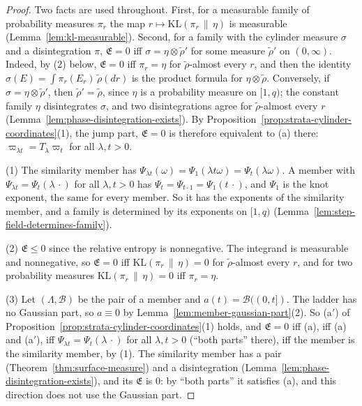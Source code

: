 \begin{proof}
Two facts are used throughout. First, for a measurable family of probability measures $\pi_r$ the
map $r \mapsto \mathrm{KL}(\pi_r \,\|\, \eta)$ is measurable (Lemma~\ref{lem:kl-measurable}).
Second, for a family with the
cylinder measure $\sigma$ and a disintegration $\pi$, $\mathfrak{E} = 0$ iff
$\sigma = \eta \otimes \tilde\rho'$ for some measure $\tilde\rho'$ on $(0,\infty)$. Indeed, by (2)
below, $\mathfrak{E} = 0$ iff $\pi_r = \eta$ for $\tilde\rho$-almost every $r$, and then the identity
$\sigma(E) = \int\pi_r(E_r)\,\tilde\rho(dr)$ is the product formula for $\eta \otimes \tilde\rho$.
Conversely, if $\sigma = \eta \otimes \tilde\rho'$, then $\tilde\rho' = \tilde\rho$, since $\eta$ is a
probability measure on $[1,q)$; the constant family $\eta$ disintegrates $\sigma$, and two
disintegrations agree for $\tilde\rho$-almost every $r$
(Lemma~\ref{lem:phase-disintegration-exists}). By
Proposition~\ref{prop:strata-cylinder-coordinates}(1), the jump part, $\mathfrak{E} = 0$ is therefore
equivalent to (a) there: $\varpi_{\lambda t} = T_\lambda\varpi_t$ for all $\lambda, t > 0$.

(1) The similarity member has $\Psi_{\lambda t}(\omega) = \Psi_1(\lambda t\omega) = \Psi_t(\lambda\omega)$.
A member with $\Psi_{\lambda t} = \Psi_t(\lambda\,\cdot)$ for all $\lambda, t > 0$ has
$\Psi_t = \Psi_{t\cdot1} = \Psi_1(t\,\cdot)$, and $\Psi_1$ is the knot exponent, the same for every
member. So it has the exponents of the similarity member, and a family is determined by its
exponents on $[1,q)$ (Lemma~\ref{lem:step-field-determines-family}).

(2) $\mathfrak{E} \le 0$ since the relative entropy is nonnegative. The integrand is measurable and
nonnegative, so $\mathfrak{E} = 0$ iff $\mathrm{KL}(\pi_r \,\|\, \eta) = 0$ for $\tilde\rho$-almost
every $r$, and for two probability measures $\mathrm{KL}(\pi_r \,\|\, \eta) = 0$ iff $\pi_r = \eta$.

(3) Let $(\Lambda, \mathcal{B})$ be the pair of a member and $a(t) = \mathcal{B}((0,t])$. The
ladder has no Gaussian part, so $a \equiv 0$ by Lemma~\ref{lem:member-gaussian-part}(2). So (a$'$) of
Proposition~\ref{prop:strata-cylinder-coordinates}(1) holds, and $\mathfrak{E} = 0$ iff (a), iff (a)
and (a$'$), iff $\Psi_{\lambda t} = \Psi_t(\lambda\,\cdot)$ for all $\lambda, t > 0$ (``both parts''
there), iff the member is the similarity member, by (1). The similarity member has a pair
(Theorem~\ref{thm:surface-measure}) and a disintegration
(Lemma~\ref{lem:phase-disintegration-exists}), and its $\mathfrak{E}$ is $0$: by ``both parts'' it
satisfies (a), and this direction does not use the Gaussian part.


\end{proof}
